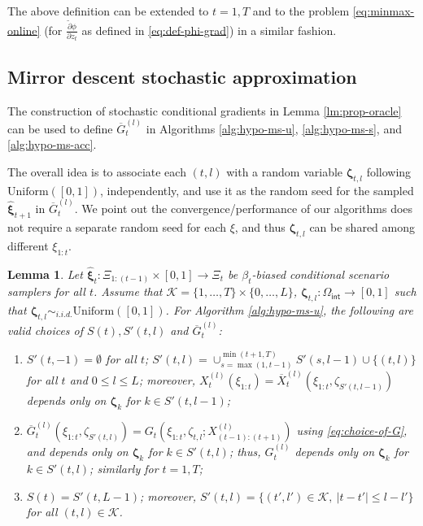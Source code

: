 \documentclass[11pt,fullpage,letterpaper]{article}
\newcommand{\mc}{\mathcal}
\newcommand{\bx}{\boldsymbol{\xi}}
\newcommand{\bz}{\boldsymbol{\zeta}}
\newcommand{\internal}{\mathsf{int}}
\newtheorem{lemma}{Lemma}[section]
\begin{document}
The above definition can be extended to $t=1,T$ and to the problem \eqref{eq:minmax-online} (for $\frac{\tilde{\partial} \phi}{\partial z_t}$ as defined in \eqref{eq:def-phi-grad}) in a similar fashion. 

\subsection{Mirror descent stochastic approximation}\label{sec:MDSA}
The construction of stochastic conditional gradients in Lemma \ref{lm:prop-oracle} can be used to define $\overline{G}_t^{(l)}$ in Algorithms \ref{alg:hypo-ms-u}, \ref{alg:hypo-ms-s}, and \ref{alg:hypo-ms-acc}. 


The overall idea is to associate each $(t,l)$ with a random variable $\bz_{t,l}$ following $\text{Uniform}([0,1])$, independently, and use it as the random seed for the sampled $\widehat{\bx}_{t+1}$ in $\overline{G}_t^{(l)}$. We point out the convergence/performance of our algorithms does not require a separate random seed for each $\xi$, and thus $\bz_{t,l}$ can be shared among different $\xi_{1:t}$.


\begin{lemma}\label{lm:MDSA-1}
Let $\widehat{\bx}_t:\Xi_{1:(t-1)}\times [0,1]\to \Xi_t$ be $\beta_t$-biased conditional scenario samplers for all $t$. Assume that $\mc K = \{1,\ldots,T\} \times \{0,\ldots,L\}$, $\bz_{t,l}:\Omega_{\internal}\to [0,1]$ such that $\bz_{t,l}\sim_{i.i.d.} \text{Uniform}([0,1])$. For Algorithm \ref{alg:hypo-ms-u}, the following are valid choices of $S(t),S'(t,l)$ and $\overline{G}_t^{(l)}$:
\begin{enumerate}
    \item $S'(t,-1) =\emptyset$ for all $t$; $S'(t,l) = \cup_{s=\max(1,t-1)}^{\min(t+1,T)} S'(s,l-1)\cup \{(t,l)\}$ for all $t$ and $0\leq l\leq L$; moreover, $X_t^{(l)}(\xi_{1:t}) = \overline{X}^{(l)}_t(\xi_{1:t},\zeta_{S'(t,l-1)})$ depends only on $\bz_k$ for $k\in S'(t,l-1)$;
    \item $\overline{G}_t^{(l)}(\xi_{1:t},\zeta_{S'(t,l)})=G_t(\xi_{1:t},\zeta_{t,l};X_{(t-1):(t+1)}^{(l)})$ using \ref{eq:choice-of-G}, and depends only on  $\bz_k$ for $k\in S'(t,l)$; thus, $G_t^{(l)}$ depends only on $\bz_k$ for $k\in S'(t,l)$; similarly for $t=1,T$;
    \item $S(t) = S'(t,L-1)$; moreover, $S'(t,l) = \{(t',l')\in \mc K,~|t-t'|\leq l-l'\}$ for all $(t,l)\in \mc K$. 
\end{enumerate}
\end{lemma}
\end{document}
